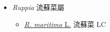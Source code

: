 
  \begin{itemize}
 \item[] \textit{Ruppia} 流蘇菜屬
                                
  \begin{itemize}
        \item[] \href{http://www.theplantlist.org/tpl1.1/search?q=Ruppia+maritima}{\textit{R. maritima} L.}   流蘇菜   LC
  \end{itemize}
  \end{itemize}
